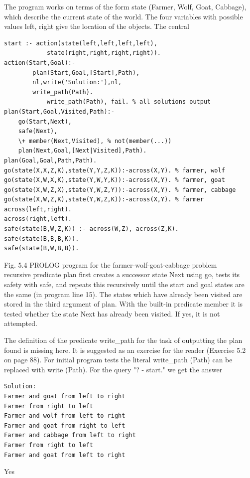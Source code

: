 \documentclass[10pt]{book}
\begin{document}
The program works on terms of the form state (Farmer, Wolf, Goat, Cabbage), which describe the current state of the world. The four variables with possible values left, right give the location of the objects. The central

\begin{verbatim}
start :- action(state(left,left,left,left),
            state(right,right,right,right)).
action(Start,Goal):-
        plan(Start,Goal,[Start],Path),
        nl,write('Solution:'),nl,
        write_path(Path).
            write_path(Path), fail. % all solutions output
plan(Start,Goal,Visited,Path):-
    go(Start,Next),
    safe(Next),
    \+ member(Next,Visited), % not(member(...))
    plan(Next,Goal,[Next|Visited],Path).
plan(Goal,Goal,Path,Path).
go(state(X,X,Z,K),state(Y,Y,Z,K)):-across(X,Y). % farmer, wolf
go(state(X,W,X,K),state(Y,W,Y,K)):-across(X,Y). % farmer, goat
go(state(X,W,Z,X),state(Y,W,Z,Y)):-across(X,Y). % farmer, cabbage
go(state(X,W,Z,K),state(Y,W,Z,K)):-across(X,Y). % farmer
across(left,right).
across(right,left).
safe(state(B,W,Z,K)) :- across(W,Z), across(Z,K).
safe(state(B,B,B,K)).
safe(state(B,W,B,B)).
\end{verbatim}

Fig. 5.4 PROLOG program for the farmer-wolf-goat-cabbage problem\\
recursive predicate plan first creates a successor state Next using go, tests its safety with safe, and repeats this recursively until the start and goal states are the same (in program line 15). The states which have already been visited are stored in the third argument of plan. With the built-in predicate member it is tested whether the state Next has already been visited. If yes, it is not attempted.

The definition of the predicate write\_path for the task of outputting the plan found is missing here. It is suggested as an exercise for the reader (Exercise 5.2 on page 88). For initial program tests the literal write\_path (Path) can be replaced with write (Path). For the query "? - start." we get the answer

\begin{verbatim}
Solution:
Farmer and goat from left to right
Farmer from right to left
Farmer and wolf from left to right
Farmer and goat from right to left
Farmer and cabbage from left to right
Farmer from right to left
Farmer and goat from left to right
\end{verbatim}

Yes
\end{document}
